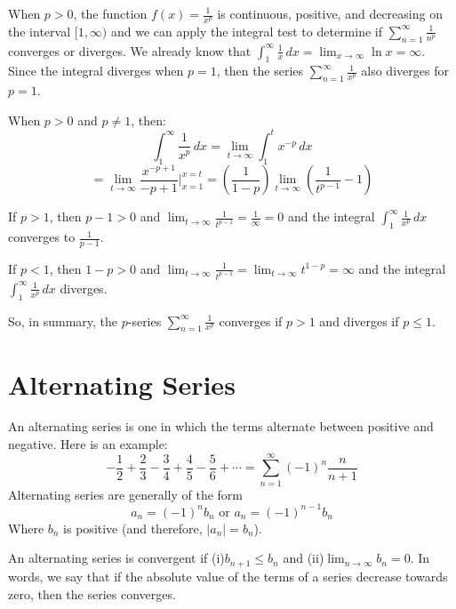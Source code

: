 When $p > 0$, the function $f(x) = \frac{1}{x^p}$ is continuous, positive, and 
decreasing on the interval $[1, \infty)$ and we can apply the integral test to 
determine if $\sum_{n=1}^\infty \frac{1}{n^p}$ converges or diverges. We 
already know that $\int_1^\infty \frac{1}{x}\,dx = \lim_{x \to \infty} \ln{x} 
= \infty$. Since the integral diverges when $p = 1$, then the series $\sum_
{n=1}^\infty \frac{1}{x^p}$ also diverges for $p = 1$. 

When $p > 0$ and $p \neq 1$, then:
$$\int_1^\infty \frac{1}{x^p}\,dx = \lim_{t \to \infty} \int_1^t x^{-p}\,dx $$
$$= \lim_{t \to \infty} \frac{x^{-p + 1}}{-p + 1}|_{x=1}^{x=t} = \left( \frac{1}
{1 - p} \right) \lim_{t \to \infty} \left( \frac{1}{t^{p - 1}} - 1 \right)$$

If $p > 1$, then $p - 1 >0$ and $\lim_{t \to \infty} \frac{1}{t^{p - 1}} = 
\frac{1}{\infty} = 0$ and the integral $\int_1^\infty \frac{1}{x^p}\,dx$ 
converges to $\frac{1}{p - 1}$. 

If $p < 1$, then $1 - p > 0$ and $\lim_{t \to \infty} \frac{1}{t^{p - 1}} = 
\lim_{t \to \infty} t^{1 - p} = \infty$ and the integral $\int_1^\infty 
\frac{1}{x^p}\,dx$ diverges. 

So, in summary, the $p$-series $\sum_{n = 1} ^ \infty \frac{1}{x^p}$ converges 
if $p > 1$ and diverges if $p \leq 1$. 






\section{Alternating Series}
An alternating series is one in which the terms alternate between positive and 
negative. Here is an example:
$$-\frac{1}{2} + \frac{2}{3} - \frac{3}{4} + \frac{4}{5} - \frac{5}{6} + 
\cdots = \sum_{n=1}^\infty (-1)^n \frac{n}{n + 1}$$
Alternating series are generally of the form
$$a_n = (-1)^n b_n \text{ or } a_n = (-1)^{n - 1} b_n$$
Where $b_n$ is positive (and therefore, $|a_n| = b_n$).

An alternating series is convergent if (i)$b_{n+1} \leq b_n$ and (ii)$\lim_{n 
\to \infty} b_n = 0$. In words, we say that if the absolute value of the terms 
of a series decrease towards zero, then the series converges. 

